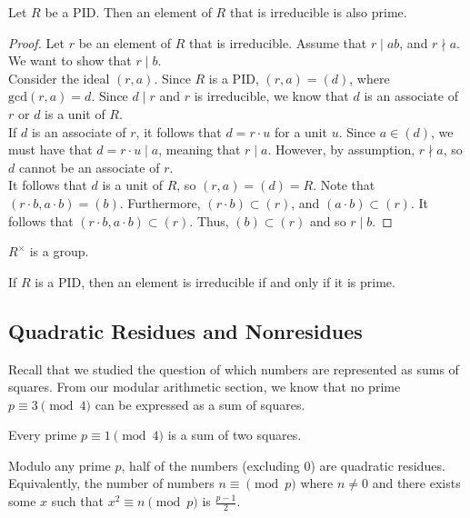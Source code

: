\documentclass[11pt]{article}
\begin{document}
\begin{lemma}
Let $R$ be a PID. Then an element of $R$ that is irreducible is also prime.
\end{lemma}

\begin{proof}
Let $r$ be an element of $R$ that is irreducible. Assume that $r \mid ab$, and $r \nmid a$. We want to show that $r \mid b$. \\

Consider the ideal $(r, a)$. Since $R$ is a PID, $(r, a) = (d)$, where $\mathrm{gcd}(r, a) = d$. Since $d \mid r$ and $r$ is irreducible,
we know that $d$ is an associate of $r$ or $d$ is a unit of $R$. \\

If $d$ is an associate of $r$, it follows that $d = r\cdot u$ for a unit $u$. Since $a \in (d)$, we 
must have that $d = r\cdot u \mid a$, meaning that $r \mid a$. However, by assumption, $r \nmid a$, so $d$ cannot be an associate of $r$. \\

It follows that $d$ is a unit of $R$, so $(r, a) = (d) = R$. Note that $(r \cdot b, a \cdot b) = (b)$. 
Furthermore, $(r \cdot b) \subset (r)$, and $(a \cdot b) \subset (r)$. It follows that $(r \cdot b, a \cdot b) \subset (r)$. Thus, $(b) \subset (r)$ and so $r \mid b$.
\end{proof}

\begin{exercise}
$R^{\times}$ is a group.    
\end{exercise}

\begin{remark}
If $R$ is a PID, then an element is irreducible if and only if it is prime.
\end{remark}

\subsection{Quadratic Residues and Nonresidues}

Recall that we studied the question of which numbers are represented as sums of squares. 
From our modular arithmetic section, we know that no prime $p \equiv 3 \pmod 4$ can be expressed as a sum of squares.

\begin{lemma}
Every prime $p \equiv 1 \pmod 4$ is a sum of two squares.
\end{lemma}

\begin{lemma}
Modulo any prime $p$, half of the numbers (excluding $0$) are quadratic residues. \\

Equivalently, the number of numbers $n \equiv \pmod p$ where
$n \neq 0$ and there exists some $x$ such that $x^2 \equiv n \pmod p$ is $\frac{p-1}{2}.$
\end{lemma}
\end{document}
